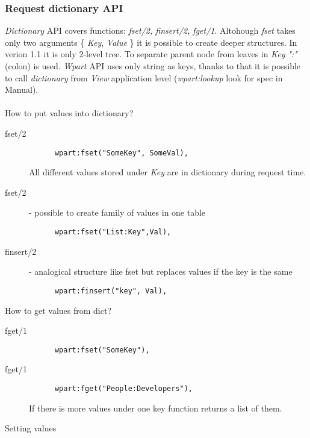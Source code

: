 \subsubsection{Request dictionary API}
\emph{Dictionary} API covers functions:\emph{ fset/2, finsert/2,
  fget/1}. Altohough \emph{fset} takes only two arguments \{ \emph{Key},
\emph{Value} \}  it is possible to create deeper structures. In verion 1.1 it is
  only 2-level tree. To separate parent node from leaves in \emph{Key}
  \emph{":"} (colon) is used. \emph{Wpart} API uses only string as keys,
  thanks to that it is possible to call \emph{dictionary} from \emph{View}
  application level (\emph{wpart:lookup} look for spec in Manual).  \\ \\
How to put values into dictionary?
\begin{description}
  \item[fset/2] 
\begin{Verbatim}
      wpart:fset("SomeKey", SomeVal),
\end{Verbatim}
      All different values stored under \emph{Key} are in dictionary during request time.

  \item[fset/2] - possible to create family of values in one table \begin{verbatim}
      wpart:fset("List:Key",Val),
    \end{verbatim}
  \item[finsert/2] - analogical structure like fset but replaces values if the
    key is the same \begin{verbatim}
      wpart:finsert("key", Val),
    \end{verbatim}  
\end{description}
\clearpage
How to get values from dict?
\begin{description}
  \item[fget/1] \begin{verbatim}
      wpart:fset("SomeKey"),
    \end{verbatim}
  \item [fget/1]  \begin{verbatim}
      wpart:fget("People:Developers"),
    \end{verbatim}
    If there is more values under one key function returns a list of them.
\end{description}
Setting values
